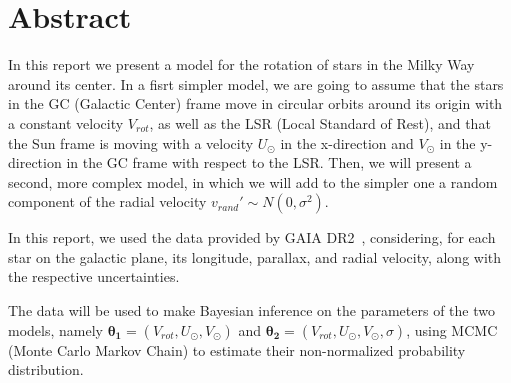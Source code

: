 \section*{Abstract}

In this report we present a model for the rotation of stars in the Milky Way around its center.
In a fisrt simpler model, we are going to assume that the stars in the GC (Galactic Center) frame move in circular orbits around its origin with a constant velocity $V_{rot}$, as well as the LSR (Local Standard of Rest), and that the Sun frame is moving with a velocity $U_{\odot}$ in the x-direction and $V_{\odot}$ in the y-direction in the GC frame with respect to the LSR. Then, we will present a second, more complex model, in which we will add to the simpler one a random component of the radial velocity $v_{rand}' \sim N(0, \sigma^2)$.



In this report, we used the data provided by GAIA DR2~\cite{GAIADR2}, considering, for each star on the galactic plane, its longitude, parallax, and radial velocity, along with the respective uncertainties.

The data will be used to make Bayesian inference on the parameters of the two models, namely $\mathbf{\theta_1} = (V_{rot}, U_{\odot}, V_{\odot})$ and $\mathbf{\theta_2} = (V_{rot}, U_{\odot}, V_{\odot}, \sigma)$, using MCMC (Monte Carlo Markov Chain) to estimate their non-normalized probability distribution. 

